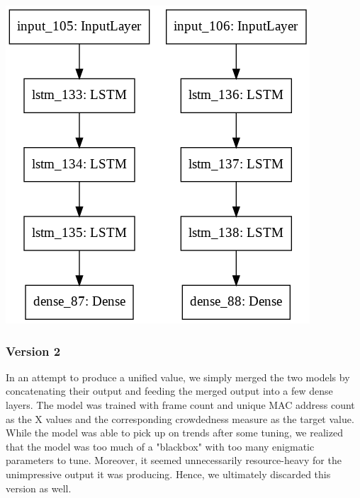 \documentclass[journal, 12pt]{IEEEtran}
\begin{document}
\begingroup
    \center
    \medskip
    \includegraphics[width=0.9\columnwidth]{./images/v1_model.png}
    \label{fig:v1}
    \medskip
\endgroup

\subsubsection{Version 2}
In an attempt to produce a unified value, we simply merged the two models by concatenating their output and feeding the merged output into a few dense layers. The model was trained with frame count and unique MAC address count as the X values and the corresponding crowdedness measure as the target value. While the model was able to pick up on trends after some tuning, we realized that the model was too much of a "blackbox" with too many enigmatic parameters to tune. Moreover, it seemed unnecessarily resource-heavy for the unimpressive output it was producing. Hence, we ultimately discarded this version as well. 
\end{document}
